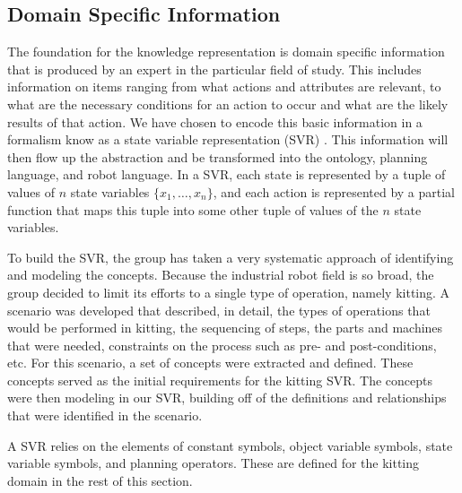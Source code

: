 \documentclass[a4paper, 10pt, conference]{ieeeconf}      %
\begin{document}
\subsection{Domain Specific Information}
\label{subsect:DomainSpecific}
The foundation for the knowledge representation is domain specific information that is produced by an expert in the particular field of study. This includes
information on items ranging from what actions and attributes are relevant, to what are the necessary conditions for an action to occur and what are the
likely results of that action. We have chosen to encode this basic information in a formalism know as a state variable representation (SVR) \cite{NAU.2004}.
This information will then flow up the abstraction and be transformed into the ontology, planning language, and robot language.
In a SVR, each state is represented by a tuple of values of $n$ state variables $\lbrace x_1,\dots,x_n\rbrace$, and each action is represented by a partial function that maps this tuple into some other tuple of values of the $n$ state variables. 

To build the SVR, the group has taken a very systematic approach of identifying and modeling the concepts. Because the industrial robot field is so broad, the group decided to limit its efforts to a single type of operation, namely kitting. A scenario was developed that described, in detail, the types of operations that would be performed in kitting, the sequencing of steps, the parts and machines that were needed, constraints on the process such as pre- and post-conditions, etc. For this scenario, a set of concepts were extracted and defined. These concepts served as the initial requirements for the kitting SVR. The concepts were then modeling in our SVR, building off of the definitions and relationships that were identified in the scenario.

A SVR relies on the elements of constant symbols, object variable symbols, state variable symbols, and planning operators. These are defined for the kitting domain in the rest of this section.
\end{document}
